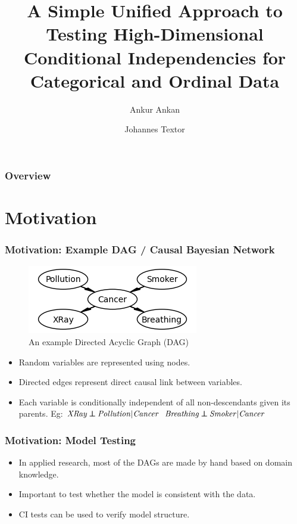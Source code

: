 \documentclass{beamer}
\def\ci{\perp\!\!\!\!\!\perp}
\begin{document}
\title{A Simple Unified Approach to Testing High-Dimensional Conditional
Independencies for Categorical and Ordinal Data}
\author {Ankur Ankan \and Johannes Textor}
\date{}
\maketitle

\begin{frame}
	\frametitle{Overview}
	\tableofcontents
\end{frame}

\section{Motivation}
\begin{frame}
	\frametitle{Motivation: Example DAG / Causal Bayesian Network}
	\begin{figure}
		\centering
		\includegraphics[scale=0.6]{imgs/example_dag.png}
		\caption*{An example Directed Acyclic Graph (DAG)}
	\end{figure}
	\begin{itemize}
		\setlength\itemsep{1em}
		\item Random variables are represented using nodes.
		\item Directed edges represent direct causal link between variables.
		\item Each variable is conditionally independent of all non-descendants given its parents. Eg: \newline
			\hspace*{20pt} $ \text{\emph{XRay}} \ci \text{\emph{Pollution}} | \text{\emph{Cancer}} $ \newline
			\hspace*{20pt} $ \text{\emph{Breathing}} \ci \text{\emph{Smoker}} | \text{\emph{Cancer}} $
	\end{itemize}
\end{frame}

\begin{frame}
	\frametitle{Motivation: Model Testing}
	\begin{itemize}
		\setlength\itemsep{1em}
		\item In applied research, most of the DAGs are made by hand
			based on domain knowledge.
		\item Important to test whether the model is consistent with the data.
		\item CI tests can be used to verify model structure.
	\end{itemize}

\end{frame}
\end{document}
